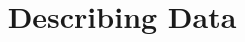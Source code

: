 \documentclass{beamer}
\title[MATH 1030 - Module 8 - Describing Data]{Describing Data}
\begin{document}
\begin{frame}
\titlepage
\end{frame}
\end{document}
